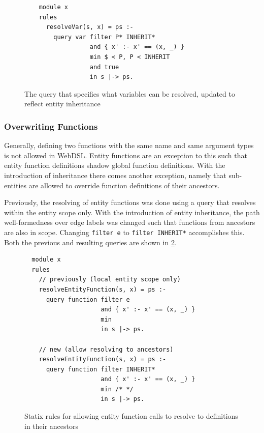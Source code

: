       \begin{figure}
        \begin{verbatim}
    module x
    rules
      resolveVar(s, x) = ps :-
        query var filter P* INHERIT*
                  and { x' :- x' == (x, _) }
                  min $ < P, P < INHERIT
                  and true
                  in s |-> ps.
        \end{verbatim}
        \caption{\label{fig:var-resolve-query-inheritance}The query that specifies what variables can be resolved, updated to reflect entity inheritance}
      \end{figure}

    \subsubsection{Overwriting Functions}

      Generally, defining two functions with the same name and same argument types is not allowed in WebDSL. Entity functions are an exception to this such that entity function definitions shadow global function definitions. With the introduction of inheritance there comes another exception, namely that sub-entities are allowed to override function definitions of their ancestors.

      Previously, the resolving of entity functions was done using a query that resolves within the entity scope only. With the introduction of entity inheritance, the path well-formedness over edge labels was changed such that functions from ancestors are also in scope. Changing \texttt{filter e} to \texttt{filter INHERIT*} accomplishes this. Both the previous and resulting queries are shown in \cref{fig:entity-function-resolve-old}.

      \begin{figure}
        \begin{verbatim}
  module x
  rules
    // previously (local entity scope only)
    resolveEntityFunction(s, x) = ps :-
      query function filter e
                     and { x' :- x' == (x, _) }
                     min
                     in s |-> ps.

    // new (allow resolving to ancestors)
    resolveEntityFunction(s, x) = ps :-
      query function filter INHERIT*
                     and { x' :- x' == (x, _) }
                     min /* */
                     in s |-> ps.
        \end{verbatim}
        \caption{\label{fig:entity-function-resolve-old}Statix rules for allowing entity function calls to resolve to definitions in their ancestors}
      \end{figure}


